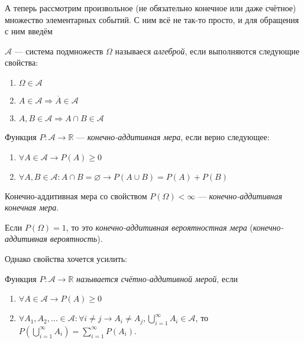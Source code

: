 А теперь рассмотрим произвольное (не обязательно конечное или даже счётное) множество элементарных событий. 
С ним всё не так-то просто, и для обращения с ним введём

\begin{define*}
  $\mathcal{A}$ --- система подмножеств $\Omega$ называеся \emph{алгеброй}, если выполняются следующие свойства:
  \begin{enumerate}
	\item $\Omega \in \mathcal{A}$
	\item $A \in \mathcal{A} \Rightarrow \overline{A} \in \mathcal{A} $
	\item $A, B \in \mathcal{A} \Rightarrow A \cap B \in \mathcal{A} $
  \end{enumerate}
\end{define*}

\begin{define*}
  Функция $P: \mathcal{A} \to \mathbb{R}$ --- \emph{конечно-аддитивная мера}, если верно следующее:
  \begin{enumerate}
	\item $\forall A \in \mathcal{A} \to P(A) \ge 0 $
	\item $\forall A, B \in \mathcal{A}: A \cap B = \varnothing \to P(A \cup B) = P(A) + P(B)$
  \end{enumerate}
\end{define*}

\begin{define*}
  Конечно-аддитивная мера со свойством $P(\Omega) < \infty$ --- \emph{конечно-аддитивная конечная мера}.
\end{define*}

\begin{define*}
  Если $P(\Omega) = 1$, то это \emph{конечно-аддитивная вероятностная мера} (\emph{конечно-аддитивная вероятность}).
\end{define*}

Однако свойства хочется усилить:
\begin{define*} Функция $P: \mathcal{A} \to \mathbb{R}$ \emph{называется счётно-аддитивной мерой}, если
  \begin{enumerate}
	\item $\forall A \in \mathcal{A}	\to P(A) \ge 0$
	\item $\forall A_1, A_2, \ldots \in \mathcal{A}: \forall i \neq j \to A_i \neq A_j, \bigcup_{i=1}^{\infty}A_i \in \mathcal{A}$, то 
	  $P(\bigcup_{i=1}^\infty A_i) = \sum_{i=1}^{\infty} P(A_i)$.
  \end{enumerate}
\end{define*}

